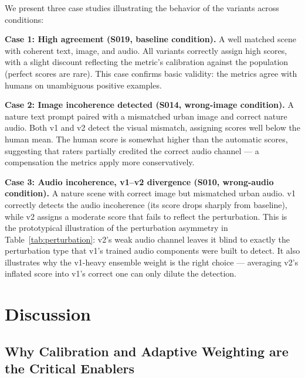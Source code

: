 We present three case studies illustrating the behavior of the variants across conditions:

\textbf{Case 1: High agreement (S019, baseline condition).} A well matched scene with coherent text, image, and audio. All variants correctly assign high scores, with a slight discount reflecting the metric's calibration against the population (perfect scores are rare). This case confirms basic validity: the metrics agree with humans on unambiguous positive examples.

\textbf{Case 2: Image incoherence detected (S014, wrong-image condition).} A nature text prompt paired with a mismatched urban image and correct nature audio. Both v1 and v2 detect the visual mismatch, assigning scores well below the human mean. The human score is somewhat higher than the automatic scores, suggesting that raters partially credited the correct audio channel — a compensation the metrics apply more conservatively.

\textbf{Case 3: Audio incoherence, v1--v2 divergence (S010, wrong-audio condition).} A nature scene with correct image but mismatched urban audio. v1 correctly detects the audio incoherence (its score drops sharply from baseline), while v2 assigns a moderate score that fails to reflect the perturbation. This is the prototypical illustration of the perturbation asymmetry in Table~\ref{tab:perturbation}: v2's weak audio channel leaves it blind to exactly the perturbation type that v1's trained audio components were built to detect. It also illustrates why the v1-heavy ensemble weight is the right choice — averaging v2's inflated score into v1's correct one can only dilute the detection.

\section{Discussion}

\subsection{Why Calibration and Adaptive Weighting are the Critical Enablers}\label{sec:calibration-discussion}

